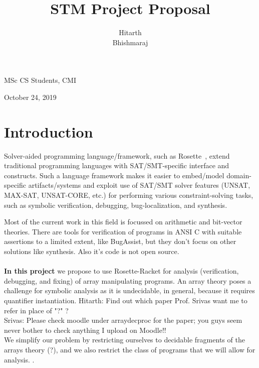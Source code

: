 \documentclass[a4paper, 12pt, notitlepage] {article}
\author{Hitarth \\ Bhishmaraj}
\title{STM Project Proposal}
\date{} %
\newcommand{\hide}[1]{}
\newcommand{\mscmt}[1]{{\color{blue} \tiny{Srivas: {#1}}}}
\newcommand{\hcmt}[1]{{\color{magenta} \tiny{Hitarth: {#1}}}}
\begin{document}
\maketitle		


\begin{center}
MSc CS Students, CMI
\end{center}
\begin{center}
October 24, 2019
\end{center}
\newpage

\section{Introduction}

Solver-aided programming language/framework, such as Rosette~\cite{??}, extend traditional programming languages with SAT/SMT-specific interface and constructs.
Such a language framework makes it easier to embed/model domain-specific artifacts/systems and exploit use of SAT/SMT solver features (UNSAT, MAX-SAT, UNSAT-CORE, etc.) for performing various constraint-solving tasks, such as symbolic verification, debugging, bug-localization, and synthesis.
%
\hide{
domain-specific languages (SDSLs) are the languages, for a specific domain, which ease the construction of programs by giving us the ability to automate the taksk like verification, debugging and synthesis. But implementing the SDSLs from the scretch is a very hard task. To simplify our taks, we use Rosette \cite{rosette_paper}. Rosette is a framework for designing solver-aided languages, and is itself a solver-aided language embedded in Racket. Rosette helps us to easily exploit the power of SAT//SMT solver in designing solutions to domain specific constraint solving problems.\\
\\
}
%
Most of the current work in this field is focussed on arithmetic and bit-vector theories. There are tools for verification of programs in ANSI C with suitable assertions to  a limited extent, like BugAssist\cite{bugassist}, but they don't focus on other solutions like synthesis. Also it's code is not open source.\\
 \\
{\bf In this project} we propose to use Rosette-Racket for analysis (verification, debugging, and fixing) of array manipulating programs.
An array theory poses a challenge for symbolic analysis as it is undecidable, in general, because it requires quantifier instantiation.
\hcmt{Find out which paper Prof. Srivas want me to refer in place of "?" ? }\\
\mscmt{Please check moodle under arraydecproc for the paper; you guys seem never bother to check anything I upload on Moodle!!}\\
We simplify our problem by restricting ourselves to decidable fragments of the arrays theory (?), and we also restrict the class of programs that we will allow for analysis. .
\end{document}
